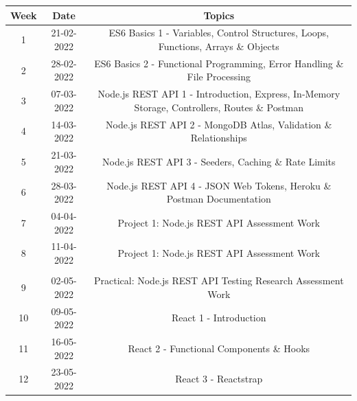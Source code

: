 \documentclass{article}
\begin{document}
\renewcommand{\arraystretch}{1.5}
\begin{tabular}{|c|c|c|c|}
	\hline
	\textbf{Week} & \textbf{Date}     & \multicolumn{2}{c|}{\textbf{Topics}}        \\ \hline
	\footnotesize 1      & \footnotesize 21-02-2022 & \multicolumn{2}{c|}{\footnotesize ES6 Basics 1 - Variables, Control Structures, Loops, Functions, Arrays \& Objects} \\ \hline
	\footnotesize 2      & \footnotesize 28-02-2022 & \multicolumn{2}{c|}{\footnotesize ES6 Basics 2 - Functional Programming, Error Handling \& File Processing} \\ \hline
	\footnotesize 3      & \footnotesize 07-03-2022 & \multicolumn{2}{c|}{\footnotesize Node.js REST API 1 - Introduction, Express, In-Memory Storage, Controllers, Routes \& Postman} \\ \hline
	\footnotesize 4      & \footnotesize 14-03-2022 & \multicolumn{2}{c|}{\footnotesize Node.js REST API 2 - MongoDB Atlas, Validation \& Relationships} \\ \hline
	\footnotesize 5      & \footnotesize 21-03-2022 & \multicolumn{2}{c|}{\footnotesize Node.js REST API 3 - Seeders, Caching \& Rate Limits} \\ \hline
	\footnotesize 6      & \footnotesize 28-03-2022 & \multicolumn{2}{c|}{\footnotesize Node.js REST API 4 - JSON Web Tokens, Heroku \& Postman Documentation} \\ \hline
	\footnotesize 7      & \footnotesize 04-04-2022 & \multicolumn{2}{c|}{\footnotesize Project 1: Node.js REST API Assessment Work} \\ \hline
	\footnotesize 8      & \footnotesize 11-04-2022 & \multicolumn{2}{c|}{\footnotesize Project 1: Node.js REST API Assessment Work} \\ \hline
	\rowcolor{yellow} \multicolumn{4}{|c|}{\footnotesize Mid Term Break}                    \\ \hline
	\footnotesize 9      & \footnotesize 02-05-2022 & \multicolumn{2}{c|}{\footnotesize Practical: Node.js REST API Testing Research Assessment Work} \\ \hline
	\footnotesize 10     & \footnotesize 09-05-2022 & \multicolumn{2}{c|}{\footnotesize React 1 - Introduction} \\ \hline
	\footnotesize 11     & \footnotesize 16-05-2022 & \multicolumn{2}{c|}{\footnotesize React 2 - Functional Components \& Hooks} \\ \hline
	\footnotesize 12     & \footnotesize 23-05-2022 & \multicolumn{2}{c|}{\footnotesize React 3 - Reactstrap}     \\ \hline

\end{tabular}
\end{document}

